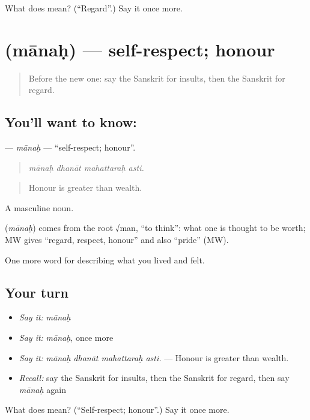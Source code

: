 \begin{tcolorbox}[breakable,colback=teal!4,colframe=teal!35!black,title={Before you move on}]
What does  mean? (\textquotedblleft{}Regard\textquotedblright{}.) Say it once more.
\end{tcolorbox}
\section[\texorpdfstring{\sk{मानः} (mānaḥ)}{मानः (mānaḥ)}]{ (mānaḥ) — self-respect; honour}

\label{lesson:SA-C459-manah}



\begin{quote}
Before the new one: say the Sanskrit for insults, then the Sanskrit for regard.
\end{quote}

\subsection*{You'll want to know: }
\textbf{} — \emph{mānaḥ} — \textquotedblleft{}self-respect; honour\textquotedblright{}.

\begin{quote}
   
\end{quote}

\begin{quote}
\emph{mānaḥ dhanāt mahattaraḥ asti.}
\end{quote}

\begin{quote}
Honour is greater than wealth.
\end{quote}

A masculine noun.

\begin{cousinweb}
\textbf{} (\emph{mānaḥ}) comes from the root √man, \textquotedblleft{}to think\textquotedblright{}: what one is thought to be worth; MW gives \textquotedblleft{}regard, respect, honour\textquotedblright{} and also \textquotedblleft{}pride\textquotedblright{} (MW).
\end{cousinweb}

\begin{grammarlens}[title={What you've built}]
One more word for describing what you lived and felt.
\end{grammarlens}

\subsection*{Your turn}
\begin{itemize}
\raggedright
  \item \emph{Say it:} \emph{mānaḥ}
  \item \emph{Say it:} \emph{mānaḥ}, once more
  \item \emph{Say it:} \emph{mānaḥ dhanāt mahattaraḥ asti.} — Honour is greater than wealth.
  \item \emph{Recall:} say the Sanskrit for insults, then the Sanskrit for regard, then say \emph{mānaḥ} again
\end{itemize}

\begin{tcolorbox}[breakable,colback=teal!4,colframe=teal!35!black,title={Before you move on}]
What does  mean? (\textquotedblleft{}Self-respect; honour\textquotedblright{}.) Say it once more.
\end{tcolorbox}
